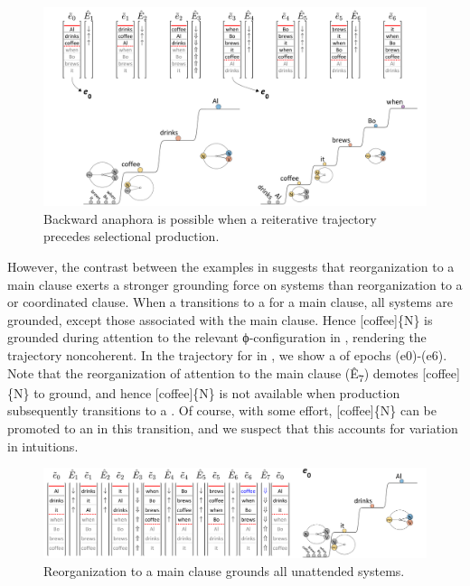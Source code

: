 \ea\label{ex:7:1}
\z
\z
  
\begin{figure}
\includegraphics[width=\textwidth]{figures/Tilsen-img154.png}
\caption{Backward anaphora is possible when a reiterative trajectory precedes selectional production.}
\label{fig:7:10}
\end{figure}
 

  However, the  contrast between the examples in  suggests that reorganization to a main clause exerts a stronger grounding force on systems than reorganization to a  or coordinated clause. When a  transitions to a  for a main clause, all systems are grounded, except those associated with the main clause. Hence [coffee]\{N\} is grounded during attention to the relevant ϕ-configuration in , rendering the trajectory noncoherent. In the trajectory for  in {}, we show a  of epochs (e0)-(e6). Note that the reorganization of attention to the main clause (Ê\textsubscript{7}) demotes [coffee]\{N\} to ground, and hence [coffee]\{N\} is not available when production subsequently transitions to a . Of course, with some effort, [coffee]\{N\} can be promoted to an  in this transition, and we suspect that this accounts for variation in  intuitions. 

\ea\label{ex:7:2}
\z
\z
  
\begin{figure}
\includegraphics[width=\textwidth]{figures/Tilsen-img155.png}
\caption{Reorganization to a main clause grounds all unattended systems.}
\label{fig:7:11}
\end{figure}
 

